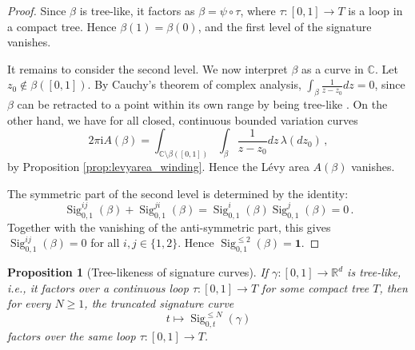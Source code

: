 \documentclass[11pt]{article}
\newtheorem{proposition}[theorem]{Proposition}
\theoremstyle{definition}
\newcommand{\R}{\mathbb{R}}
\newcommand{\Sig}{\operatorname{Sig}}
\newcommand{\id}{\mathbf{1}}
\begin{document}
\begin{proof}
  Since $\beta$ is tree-like, it factors as $\beta=\psi\circ\tau$, where $\tau:[0,1] \to T$ is a loop in a compact tree. Hence $\beta(1)=\beta(0)$, and the first level of the signature vanishes.

It remains to consider the second level. We now interpret $\beta$ as a curve in $\mathbb{C}$. Let $ z_0 \notin \beta([0,1]) $. By Cauchy's theorem of complex analysis, $\int_\beta \frac{1}{z-z_0} d z=0$, since $\beta$ can be retracted to a point within its own range by being tree-like \cite[Theorem 5.15]{L2017}. On the other hand, we have for all closed, continuous bounded variation curves
\[
2 \pi \textrm{i} A(\beta) = \int_{\mathbb{C} \setminus \beta([0,1])} \int_{\beta} \frac{1}{z-z_0} d z \, \lambda(dz_0) \, ,
\]  
by Proposition \ref{prop:levyarea_winding}. Hence the L\'evy area $A(\beta)$ vanishes.

The symmetric part of the second level is determined by the identity:
\[
   \Sig^{ij}_{0,1}(\beta)+  \Sig^{ji}_{0,1}(\beta)
  =
  \Sig^i_{0,1}(\beta)  \Sig^j_{0,1}(\beta)=0 \, .
\]
Together with the vanishing of the anti-symmetric part, this gives $\Sig^{ij}_{0,1}(\beta)=0$ for all $i,j\in\{1,2\}$. Hence $\Sig^{\leq 2}_{0,1}(\beta)=\id$.
\end{proof}

\begin{proposition}[Tree-likeness of signature curves]\label{prop:lifts-tree-like}
If $ \gamma:[0,1]\to\R^d $ is tree-like, i.e., it factors over a continuous loop $ \tau:[0,1] \to T $ for some compact tree $T$, then for every $N\geq 1$, the truncated signature curve
\[
  t\longmapsto \Sig^{\leq N}_{0,t}(\gamma)
\]
factors over the same loop $\tau: [0,1] \to T$.
\end{proposition}
\end{document}
